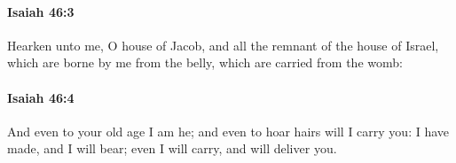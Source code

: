 		\paragraph{Isaiah 46:3} %
			\label{ISAIAH-46-3}

			Hearken unto me, O house of Jacob, and all the remnant of the house of Israel, which are borne by me from the belly, which are carried from the womb:


		\paragraph{Isaiah 46:4} %
			\label{ISAIAH-46-4}

			And even to your old age I am he; and even to hoar hairs will I carry you: I have made, and I will bear; even I will carry, and will deliver you.


